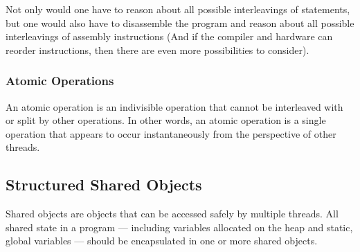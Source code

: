 \documentclass{article}
\begin{document}
Not only would one have to reason about all possible interleavings of statements, but one would also have to disassemble the program and reason about all possible interleavings of assembly instructions (And if the compiler and hardware can reorder instructions, then there are even more possibilities to consider).

\subsubsection{Atomic Operations}
\begin{definition}
    An atomic operation is an indivisible operation that cannot be interleaved with or split by other operations. In other words, an atomic operation is a single operation that appears to occur instantaneously from the perspective of other threads.
\end{definition}

\subsection{Structured Shared Objects}
\begin{definition}
    Shared objects are objects that can be accessed safely by multiple threads. All shared state in a program --- including variables allocated on the heap and static, global variables --- should be encapsulated in one or more shared objects.
\end{definition}
\end{document}
